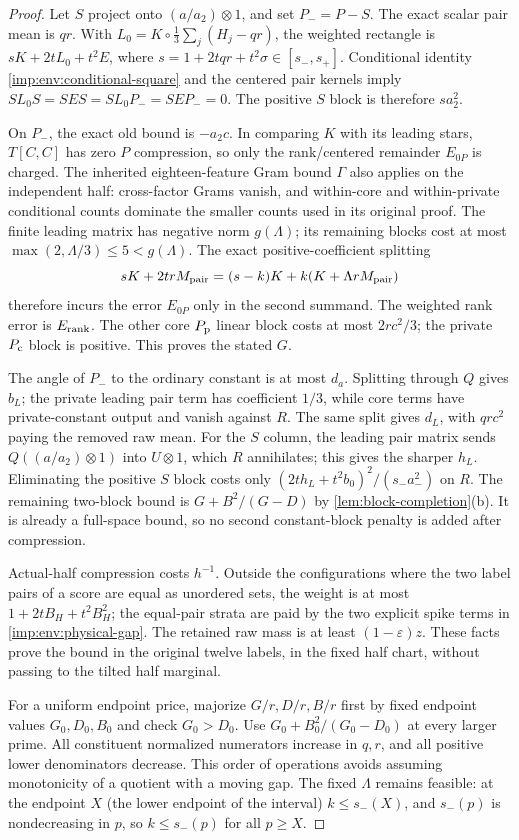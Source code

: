 \begin{proof}
Let $S$ project onto $(a/a_2)\otimes1$, and set $P_-=P-S$.
The exact scalar pair mean is $qr$.  With
$L_0=K\circ\frac13\sum_j(H_j-qr)$,
the weighted rectangle is $sK+2tL_0+t^2E$, where
$s=1+2tqr+t^2\sigma\in[s_-,s_+]$.
Conditional identity \eqref{imp:env:conditional-square} and
the centered pair kernels imply
$SL_0S=SES=SL_0P_-=SEP_-=0$.
The positive $S$ block is therefore $sa_2^2$.

On $P_-$, the exact old bound is $-a_2c$.
In comparing $K$ with its leading stars, $T[C,C]$ has zero
$P$ compression, so only the rank/centered remainder $E_{0P}$
is charged.  The inherited eighteen-feature Gram bound $\Gamma$
also applies on the independent half: cross-factor Grams vanish,
and within-core and within-private conditional counts dominate
the smaller counts used in its original proof.
The finite leading matrix has negative norm $g(\Lambda)$;
its remaining blocks cost at most
$\max(2,\Lambda/3)\le5<g(\Lambda)$.
The exact positive-coefficient splitting
\[
 sK+2trM_{\rm pair}=(s-k)K+k(K+\Lambda rM_{\rm pair})
\]
therefore incurs the error $E_{0P}$ only in the second summand.
The weighted rank error is $E_{\rm rank}$.
The other core $P_{\rm p}$ linear block costs at most $2rc^2/3$;
the private $P_{\rm c}$ block is positive.  This proves the stated $G$.

The angle of $P_-$ to the ordinary constant is at most $d_a$.
Splitting through $Q$ gives $b_L$; the private leading pair term
has coefficient $1/3$, while core terms have private-constant output
and vanish against $R$.  The same split gives $d_L$, with $qrc^2$
paying the removed raw mean.  For the $S$ column, the leading pair
matrix sends $Q((a/a_2)\otimes1)$ into $U\otimes1$, which $R$
annihilates; this gives the sharper $h_L$.
Eliminating the positive $S$ block costs only
$(2th_L+t^2b_0)^2/(s_-a_-^2)$ on $R$.
The remaining two-block bound is $G+B^2/(G-D)$ by
\cref{lem:block-completion}(b).
It is already a full-space bound, so no second constant-block
penalty is added after compression.

Actual-half compression costs $h^{-1}$.
Outside the configurations where the two label pairs of a score
are equal as unordered sets, the weight is at most
$1+2tB_H+t^2B_H^2$; the equal-pair strata are paid by the
two explicit spike terms in \eqref{imp:env:physical-gap}.
The retained raw mass is at least $(1-\varepsilon)z$.
These facts prove the bound in the original twelve labels, in
the fixed half chart, without passing to the tilted half marginal.

For a uniform endpoint price, majorize $G/r,D/r,B/r$ first by
fixed endpoint values $G_0,D_0,B_0$ and check $G_0>D_0$.
Use $G_0+B_0^2/(G_0-D_0)$ at every larger prime.
All constituent normalized numerators increase in $q,r$, and
all positive lower denominators decrease.  This order of operations
avoids assuming monotonicity of a quotient with a moving gap.
The fixed $\Lambda$ remains feasible: at the endpoint $X$ (the
lower endpoint of the interval) $k\le s_-(X)$, and $s_-(p)$ is
nondecreasing in $p$, so $k\le s_-(p)$ for all $p\ge X$.
\end{proof}

